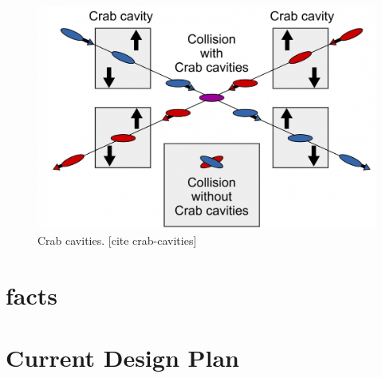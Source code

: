 \begin{figure}[H]
    \centering
    \includegraphics[width=.8\linewidth]{img/crab_cavities.jpg}
    \caption{Crab cavities. [cite crab-cavities]}
    \label{fig:eic:crab_cavities}
\end{figure}


\section{facts}


\section{Current Design Plan}



